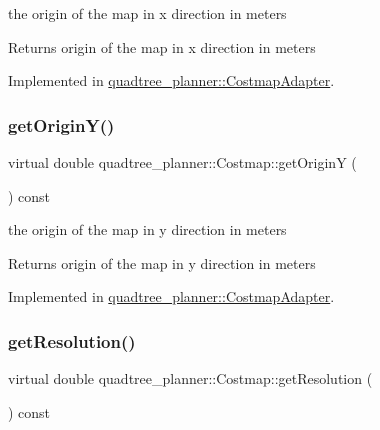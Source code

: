 the origin of the map in x direction in meters 

\begin{DoxyReturn}{Returns}
origin of the map in x direction in meters 
\end{DoxyReturn}


Implemented in \hyperlink{classquadtree__planner_1_1CostmapAdapter_ad63fb92c24234eb69b7672a7c9f15d26}{quadtree\+\_\+planner\+::\+Costmap\+Adapter}.

\mbox{\label{classquadtree__planner_1_1Costmap_aa2b342e257504329321109b1822ca302}} 
\subsubsection{\texorpdfstring{get\+Origin\+Y()}{getOriginY()}}
{\footnotesize\ttfamily virtual double quadtree\+\_\+planner\+::\+Costmap\+::get\+OriginY (\begin{DoxyParamCaption}{ }\end{DoxyParamCaption}) const\hspace{0.3cm}{\ttfamily [pure virtual]}}



the origin of the map in y direction in meters 

\begin{DoxyReturn}{Returns}
origin of the map in y direction in meters 
\end{DoxyReturn}


Implemented in \hyperlink{classquadtree__planner_1_1CostmapAdapter_a004ee5ebfac631b47f6d3987e933cd38}{quadtree\+\_\+planner\+::\+Costmap\+Adapter}.

\mbox{\label{classquadtree__planner_1_1Costmap_aaef2845def8e7320a7fa576e9efab289}} 
\subsubsection{\texorpdfstring{get\+Resolution()}{getResolution()}}
{\footnotesize\ttfamily virtual double quadtree\+\_\+planner\+::\+Costmap\+::get\+Resolution (\begin{DoxyParamCaption}{ }\end{DoxyParamCaption}) const\hspace{0.3cm}{\ttfamily [pure virtual]}}



